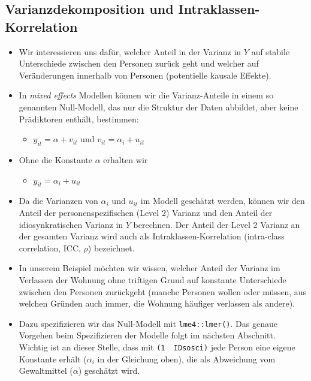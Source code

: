\documentclass[
]{book}
\providecommand{\tightlist}{%
  \setlength{\itemsep}{0pt}\setlength{\parskip}{0pt}}
\begin{document}
\hypertarget{varianzdekomposition-und-intraklassen-korrelation}{%
\subsection*{Varianzdekomposition und Intraklassen-Korrelation}\label{varianzdekomposition-und-intraklassen-korrelation}}

\begin{itemize}
\item
  Wir interessieren uns dafür, welcher Anteil in der Varianz in \(Y\) auf stabile Unterschiede zwischen den Personen zurück geht und welcher auf Veränderungen innerhalb von Personen (potentielle kausale Effekte).
\item
  In \emph{mixed effects} Modellen können wir die Varianz-Anteile in einem so genannten Null-Modell, das nur die Struktur der Daten abbildet, aber keine Prädiktoren enthält, bestimmen:

  \begin{itemize}
  \tightlist
  \item
    \(y_{it}= \alpha + v_{it}\) und \(v_{it} = \alpha_{i}+ u_{it}\)
  \end{itemize}
\item
  Ohne die Konstante \(\alpha\) erhalten wir

  \begin{itemize}
  \tightlist
  \item
    \(y_{it} = \alpha_{i}+ u_{it}\)
  \end{itemize}
\item
  Da die Varianzen von \(\alpha_i\) und \(u_{it}\) im Modell geschätzt werden, können wir den Anteil der personenspezifischen (Level 2) Varianz und den Anteil der idiosynkratischen Varianz in \(Y\) berechnen. Der Anteil der Level 2 Varianz an der gesamten Varianz wird auch als Intraklassen-Korrelation (intra-class correlation, ICC, \(\rho\)) bezeichnet.
\item
  In unserem Beispiel möchten wir wissen, welcher Anteil der Varianz im Verlassen der Wohnung ohne triftigen Grund auf konstante Unterschiede zwischen den Personen zurückgeht (manche Personen wollen oder müssen, aus welchen Gründen auch immer, die Wohnung häufiger verlassen als andere).
\item
  Dazu spezifizieren wir das Null-Modell mit \texttt{lme4::lmer()}. Das genaue Vorgehen beim Spezifizieren der Modelle folgt im nächsten Abschnitt. Wichtig ist an dieser Stelle, dass mit \texttt{(1\ \textbar{}\ IDsosci)} jede Person eine eigene Konstante erhält (\(\alpha_i\) in der Gleichung oben), die als Abweichung vom Gewaltmittel (\(\alpha\)) geschätzt wird.
\end{itemize}
\end{document}
